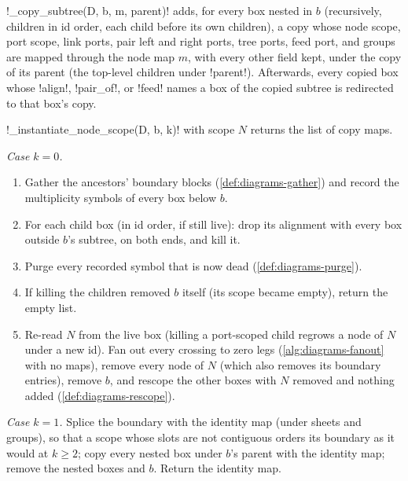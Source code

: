 \begin{definition}\label{def:diagrams-copy-subtree}
\py!_copy_subtree(D, b, m, parent)! adds, for every box nested in $b$ (recursively, children in id order, each child before its own children), a copy whose node scope, port scope, link ports, pair left and right ports, tree ports, feed port, and groups are mapped through the node map $m$, with every other field kept, under the copy of its parent (the top-level children under \py!parent!). Afterwards, every copied box whose \py!align!, \py!pair_of!, or \py!feed! names a box of the copied subtree is redirected to that box's copy.
\end{definition}

\begin{algorithm}\label{alg:diagrams-node-scope}
\py!_instantiate_node_scope(D, b, k)! with scope $N$ returns the list of copy maps.

\emph{Case $k=0$.}
\begin{enumerate}
\item Gather the ancestors' boundary blocks (\cref{def:diagrams-gather}) and record the multiplicity symbols of every box below $b$.
\item For each child box (in id order, if still live): drop its alignment with every box outside $b$'s subtree, on both ends, and kill it.
\item Purge every recorded symbol that is now dead (\cref{def:diagrams-purge}).
\item If killing the children removed $b$ itself (its scope became empty), return the empty list.
\item Re-read $N$ from the live box (killing a port-scoped child regrows a node of $N$ under a new id). Fan out every crossing to zero legs (\cref{alg:diagrams-fanout} with no maps), remove every node of $N$ (which also removes its boundary entries), remove $b$, and rescope the other boxes with $N$ removed and nothing added (\cref{def:diagrams-rescope}).
\end{enumerate}

\emph{Case $k=1$.} Splice the boundary with the identity map (under sheets and groups), so that a scope whose slots are not contiguous orders its boundary as it would at $k\ge 2$; copy every nested box under $b$'s parent with the identity map; remove the nested boxes and $b$. Return the identity map.


\end{algorithm}
